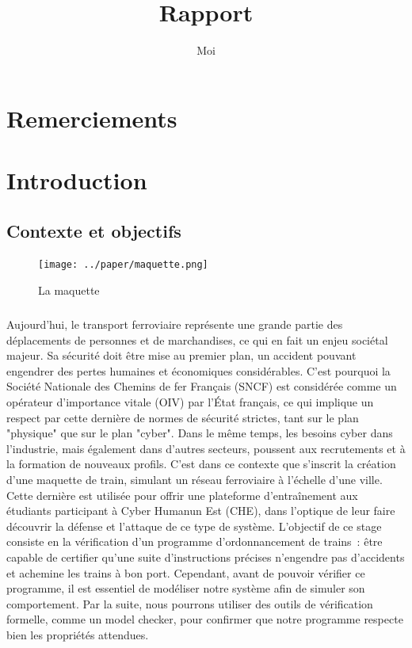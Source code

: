 \documentclass[oneside, a4paper, 11pt]{book}
\title{Rapport}
\author{Moi}
\begin{document}
\frontmatter
\maketitle

\chapter*{Remerciements}

\tableofcontents

\mainmatter

\chapter{Introduction}
\label{sec:intro}

\section{Contexte et objectifs}

\begin{figure}
	\begin{minipage}{0.28\textwidth}
		\centering
		\vspace{-0mm}
		\texttt{[image: ../paper/maquette.png]}
		\caption{La maquette}
		\label{fig:maquette}
	\end{minipage}
\end{figure}

\paragraph{}
Aujourd'hui, le transport ferroviaire représente une grande partie des déplacements de personnes et de marchandises, ce qui en fait un enjeu sociétal majeur.
Sa sécurité doit être mise au premier plan, un accident pouvant engendrer des pertes humaines et économiques considérables. C'est pourquoi la Société Nationale des Chemins de fer Français (SNCF) est considérée comme un opérateur d'importance vitale (OIV) par l'État français, ce qui implique un respect par cette dernière de normes de sécurité strictes, tant sur le plan "physique" que sur le plan "cyber". 
Dans le même temps, les besoins cyber dans l'industrie, mais également dans d'autres secteurs, poussent aux recrutements et à la formation de nouveaux profils.
C'est dans ce contexte que s'inscrit la création d'une maquette de train, simulant un réseau ferroviaire à l'échelle d'une ville. Cette dernière est utilisée pour offrir une plateforme d'entraînement aux étudiants participant à Cyber Humanun Est (CHE), dans l'optique de leur faire découvrir la défense et l'attaque de ce type de système.
L'objectif de ce stage consiste en la vérification d'un programme d'ordonnancement de trains~: être capable de certifier qu'une suite d'instructions précises n'engendre pas d'accidents et achemine les trains à bon port.
Cependant, avant de pouvoir vérifier ce programme, il est essentiel de modéliser notre système afin de simuler son comportement. Par la suite, nous pourrons utiliser des outils de vérification formelle, comme un model checker, pour confirmer que notre programme respecte bien les propriétés attendues.
\end{document}
